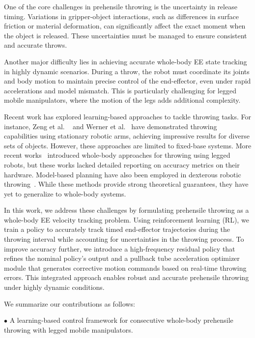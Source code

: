 \documentclass[letterpaper, 10 pt, conference]{ieeeconf} %
\begin{document}
One of the core challenges in prehensile throwing is the uncertainty in release timing. Variations in gripper-object interactions, such as differences in surface friction or material deformation, can significantly affect the exact moment when the object is released. These uncertainties must be managed to ensure consistent and accurate throws.

Another major difficulty lies in achieving accurate whole-body EE state tracking in highly dynamic scenarios. During a throw, the robot must coordinate its joints and body motion to maintain precise control of the end-effector, even under rapid accelerations and model mismatch. This is particularly challenging for legged mobile manipulators, where the motion of the legs adds additional complexity.

Recent work has explored learning-based approaches to tackle throwing tasks. For instance, Zeng et al. ~\cite{zeng2020tossingbot} and Werner et al.~\cite{werner2024dynamic} have demonstrated throwing capabilities using stationary robotic arms, achieving impressive results for diverse sets of objects. However, these approaches are limited to fixed-base systems. More recent works~\cite{munn2024whole, ha2024umi} introduced whole-body approaches for throwing using legged robots, but these works lacked detailed reporting on accuracy metrics on their hardware. Model-based planning have also been employed in dexterous robotic throwing~\cite{liu2024tube,liu2022solution}. While these methods provide strong theoretical guarantees, they have yet to generalize to whole-body systems.

In this work, we address these challenges by formulating prehensile throwing as a whole-body EE velocity tracking problem. Using reinforcement learning (RL), we train a policy to accurately track timed end-effector trajectories during the throwing interval while accounting for uncertainties in the throwing process. To improve accuracy further, we introduce a high-frequency residual policy that refines the nominal policy’s output and a pullback tube acceleration optimizer module that generates corrective motion commands based on real-time throwing errors. This integrated approach enables robust and accurate prehensile throwing under highly dynamic conditions. 

We summarize our contributions as follows:

$\bullet$ A learning-based control framework for consecutive whole-body prehensile throwing with legged mobile manipulators.
\end{document}
